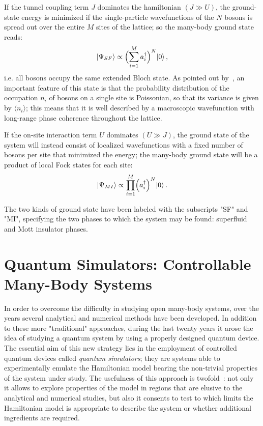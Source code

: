 If the tunnel coupling term $J$ dominates the hamiltonian $(J \gg U)$, the ground-state energy is minimized if the single-particle wavefunctions of the $N$ bosons is spread out over the entire $M$ sites of the lattice; so the many-body ground state reads:
\begin{equation}
    \ket{\Psi_{SF}} \propto \Bigl( \sum_{i=1}^M a^{\dagger}_i \Bigl)^N \ket{0},
\end{equation}
i.e. all bosons occupy the same extended Bloch state. As pointed out by~\cite{Greiner_bose_hubbard}, an important feature of this state is that the probability distribution of the occupation $n_i$ of bosons on a single site is Poissonian, so that its variance is given by $\langle n_i \rangle$; this means that it is well described by a macroscopic wavefunction with long-range phase coherence throughout the lattice.

If the on-site interaction term $U$ dominates $(U \gg J)$, the ground state of the system will instead consist of localized wavefunctions with a fixed number of bosons per site that minimized the energy; the many-body ground state will be a product of local Fock states for each site:
\begin{equation}
    \ket{\Psi_{MI}} \propto \prod_{i=1}^M \Bigl( a^{\dagger}_i\Bigl)^N \ket{0}.
\end{equation}

The two kinds of ground state have been labeled with the subscripts "SF" and "MI", specifying the two phases to which the system may be found: superfluid and Mott insulator phases.


\section[Quantum Simulators: Controllable Many-Body Systems]{Quantum Simulators: Controllable \\Many-Body Systems}
In order to overcome the difficulty in studying open many-body systems, over the years several analytical and numerical methods have been developed. In addition to these more "traditional" approaches, during the last twenty years it arose the idea of studying a quantum system by using a properly designed quantum device. The essential aim of this new strategy lies in the employment of controlled quantum devices called \emph{quantum simulators}; they are systems able to experimentally emulate the Hamiltonian model bearing the non-trivial properties of the system under study. The usefulness of this approach is twofold~\cite{Tomadin_Fazio}:  not only it allows to explore properties of the model in regions that are elusive to the analytical and numerical studies, but also it consents to test to which limits the Hamiltonian model is appropriate to describe the system or whether additional ingredients are required.

